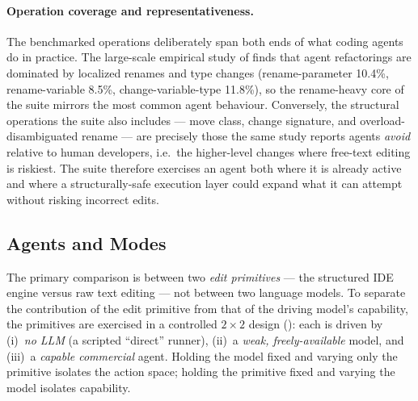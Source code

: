 \paragraph{Operation coverage and representativeness.} The benchmarked operations
deliberately span both ends of what coding agents do in practice. The large-scale
empirical study of \citet{agenticrefactoring2025} finds that agent refactorings are
dominated by localized renames and type changes (rename-parameter 10.4\%,
rename-variable 8.5\%, change-variable-type 11.8\%), so the rename-heavy core of the
suite mirrors the most common agent behaviour. Conversely, the structural operations
the suite also includes --- move class, change signature, and
overload-disambiguated rename --- are precisely those the same study reports agents
\emph{avoid} relative to human developers, i.e.\ the higher-level changes where
free-text editing is riskiest. The suite therefore exercises an agent both where it
is already active and where a structurally-safe execution layer could expand what it
can attempt without risking incorrect edits.

\subsection{Agents and Modes}
\label{sec:eval-modes}
The primary comparison is between two \emph{edit primitives} --- the structured
IDE engine versus raw text editing --- not between two language models. To
separate the contribution of the edit primitive from that of the driving model's
capability, the primitives are exercised in a controlled $2\times2$ design
(): each is driven by (i)~\emph{no LLM} (a scripted ``direct''
runner), (ii)~a \emph{weak, freely-available} model, and (iii)~a \emph{capable
commercial} agent. Holding the model fixed and varying only the primitive
isolates the action space; holding the primitive fixed and varying the model
isolates capability.

